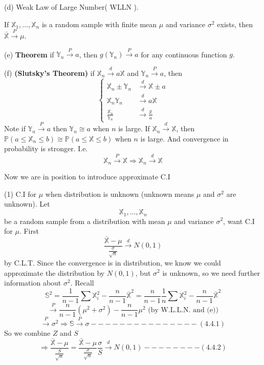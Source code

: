 (d) Weak Law of Large Number( WLLN ).

If $\mathbb{X}_1, ..., \mathbb{X}_n$ is a random sample with finite mean $\mu$ and variance $\sigma^2$ exists, then $\bar{\mathbb{X}} \overset{P}{\to} \mu$.

(e) \textbf{Theorem} if $\mathbb{Y}_n \overset{P}{\to} a$, then $g(\mathbb{Y}_n) \overset{P}{\to} a$ for any continuous function $g$.

(f) \textbf{(Slutsky's Theorem)} if $\mathbb{X}_n \overset{d}{\to} a \mathbb{X}$ and $\mathbb{Y}_n \overset{P}{\to} a$, then
$$\begin{cases}
\mathbb{X}_n \pm \mathbb{Y}_n & \overset{d}{\to} \mathbb{X} \pm a \\
\mathbb{X}_n \mathbb{Y}_n & \overset{d}{\to} a\mathbb{X} \\
\frac{\mathbb{X}_n}{\mathbb{Y}_n} & \overset{d}{\to} \frac{\mathbb{X}}{a}
\end{cases}$$
Note if $\mathbb{Y}_n \overset{P}{\to} a$ then $\mathbb{Y}_n \cong a$ when $n$ is large. If $\mathbb{X}_n \overset{d}{\to} \mathbb{X}$, then $\mathbb{P}(a \leq \mathbb{X}_n \leq b) \cong \mathbb{P}(a \leq \mathbb{X} \leq b)$ when $n$ is large. And convergence in probability is stronger. I.e.
$$\mathbb{X}_n \overset{P}{\to} \mathbb{X} \Rightarrow \mathbb{X}_n \overset{d}{\to} \mathbb{X}$$

Now we are in position to introduce approximate C.I

(1) C.I for $\mu$ when distribution is unknown (unknown means $\mu$ and $\sigma^2$ are unknown). Let $$\mathbb{X}_1, ..., \mathbb{X}_n$$ be a random sample from a distribution with mean $\mu$ and variance $\sigma^2$, want C.I for $\mu$. First
$$\frac{\bar{\mathbb{X}}-\mu}{\frac{\sigma}{\sqrt{n}}} \overset{d}{\to} N(0, 1)$$
by C.L.T. Since the convergence is in distribution, we know we could approximate the distribution by $N(0, 1)$, but $\sigma^2$ is unknown, so we need further information about $\sigma^2$. Recall
$$\mathbb{S}^2 = \frac{1}{n-1}\sum \mathbb{X}_i^2 - \frac{n}{n-1}\bar{\mathbb{X}}^2 = \frac{n}{n-1}\frac{1}{n}\sum \mathbb{X}_i^2 - \frac{n}{n-1}\bar{\mathbb{X}}^2$$
$$\overset{P}{\to} \frac{n}{n-1} (\mu^2+\sigma^2) - \frac{n}{n-1} \mu^2 \text{ (by W.L.L.N. and (e))}$$
$$\overset{P}{\to} \sigma^2 \Rightarrow \mathbb{S} \overset{P}{\to} \sigma --------------- (4.4.1)$$
So we combine $Z$ and $S$
$$\Rightarrow \frac{\bar{\mathbb{X}}-\mu}{\frac{S}{\sqrt{n}}}  = \frac{\bar{\mathbb{X}}-\mu}{\frac{\sigma}{\sqrt{n}}} \frac{\sigma}{S}\overset{d}{\to} N(0, 1) -------- (4.4.2)$$

